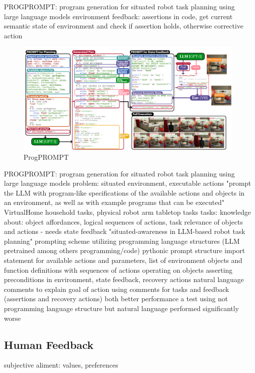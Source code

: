 \documentclass{article}
\begin{document}
\cite{singh_progprompt_2023} PROGPROMPT: program generation for situated robot task planning using large language models
environment feedback: assertions in code, get current semantic state of environment and check if assertion holds, otherwise corrective action
\begin{figure}[h]
	\centering
	\includegraphics[width=1.0\linewidth]{ProgPROMPT.png}
	\caption{ProgPROMPT \cite{singh_progprompt_2023}}
	\label{fig:progprompt}
\end{figure}
\cite{singh_progprompt_2023} PROGPROMPT: program generation for situated robot task planning using large language models
problem: situated environment, executable actions
"prompt the LLM with program-like specifications of the available actions and objects in an environment, as well as with example programs that can be executed"
VirtualHome household tasks, physical robot arm tabletop tasks
tasks: knowledge about: object affordances, logical sequences of actions, task relevance of objects and actions - needs state feedback
"situated-awareness in LLM-based robot task planning"
prompting scheme utilizing programming language structures (LLM pretrained among others programming/code)
pythonic prompt structure
import statement for available actions and parameters, list of environment objects and function definitions with sequences of actions operating on objects
asserting preconditions in environment, state feedback, recovery actions
natural language comments to explain goal of action
using comments for tasks and feedback (assertions and recovery actions) both better performance
a test using not programming language structure but natural language performed significantly worse

\subsection{Human Feedback}
subjective
aliment: values, preferences
\end{document}
